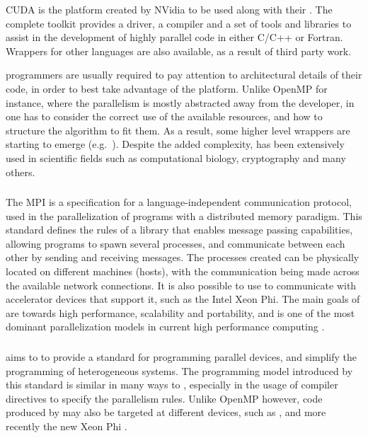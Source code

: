 \documentclass[main.tex]{subfiles}
\begin{document}
CUDA is the platform created by NVidia to be used along with their \gpus. The complete \cuda toolkit provides a driver, a compiler and a set of tools and libraries to assist in the development of highly parallel \gpu code in either C/C++ or Fortran. Wrappers for other languages are also available, as a result of third party work.

\cuda programmers are usually required to pay attention to architectural details of their code, in order to best take advantage of the platform. Unlike OpenMP for instance, where the parallelism is mostly abstracted away from the developer, in \cuda one has to consider the correct use of the available resources, and how to structure the algorithm to fit them. As a result, some higher level wrappers are starting to emerge (e.g.\ \openacc). Despite the added complexity, \cuda has been extensively used in scientific fields such as computational biology, cryptography and many others.



\subsubsection{\mpi}

The \acf{MPI} is a specification for a language-independent communication protocol, used in the parallelization of programs with a distributed memory paradigm. This standard defines the rules of a library that enables message passing capabilities, allowing programs to spawn several processes, and communicate between each other by sending and receiving messages. The processes created can be physically located on different machines (hosts), with the communication being made across the available network connections. It is also possible to use \mpi to communicate with accelerator devices that support it, such as the Intel Xeon Phi. The main goals of \mpi are towards high performance, scalability and portability, and is one of the most dominant parallelization models in current high performance computing \cite{sur2006high}.


\subsubsection{\openacc}
\openacc aims to to provide a standard for programming parallel devices, and simplify the programming of heterogeneous systems.
The programming model introduced by this standard is similar in many ways to \openmp, especially in the usage of compiler directives to specify the parallelism rules. Unlike \acs{OpenMP} however, code produced by \openacc may also be targeted at different devices, such as \gpus, and more recently the new \intel Xeon Phi \cite{openacc-phi2012}.
\end{document}
